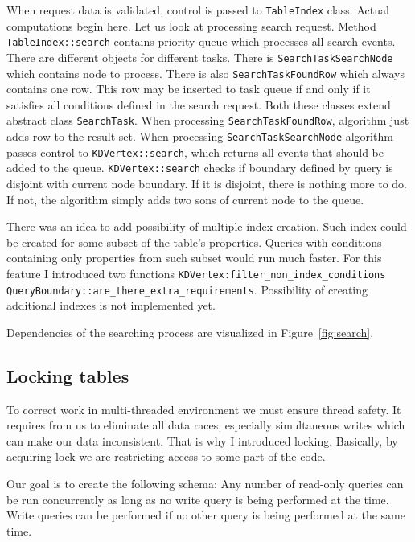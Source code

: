 \documentclass[10pt,a4paper]{article}
\begin{document}
When request data is validated, control is passed to \verb|TableIndex| class. Actual computations begin here. Let us look at processing search request. Method \verb|TableIndex::search| contains priority queue which processes all search events. There are different objects for different tasks. There is \verb|SearchTaskSearchNode| which contains node to process. There is also \verb|SearchTaskFoundRow| which always contains one row. This row may be inserted to task queue if and only if it satisfies all conditions defined in the search request. Both these classes extend abstract class \verb|SearchTask|. When processing \verb|SearchTaskFoundRow|, algorithm just adds row to the result set. When processing \verb|SearchTaskSearchNode| algorithm passes control to \verb|KDVertex::search|, which returns all events that should be added to the queue. \verb|KDVertex::search| checks if boundary defined by query is disjoint with current node boundary. If it is disjoint, there is nothing more to do. If not, the algorithm simply adds two sons of current node to the queue.

There was an idea to add possibility of multiple index creation. Such index could be created for some subset of the table's properties. Queries with conditions containing only properties from such subset would run much faster. For this feature I introduced two functions \verb|KDVertex:filter_non_index_conditions| \verb|QueryBoundary::are_there_extra_requirements|. Possibility of creating additional indexes is not implemented yet.  

Dependencies of the searching process are visualized in Figure~\ref{fig:search}.

\subsection{Locking tables}

To correct work in multi-threaded environment we must ensure thread safety. It requires from us to eliminate all data races, especially simultaneous writes which can make our data inconsistent. That is why I introduced locking. Basically, by acquiring lock we are restricting access to some part of the code. 

Our goal is to create the following schema: Any number of read-only queries can be run concurrently as long as no write query is being performed at the time. Write queries can be performed if no other query is being performed at the same time. 
\end{document}
